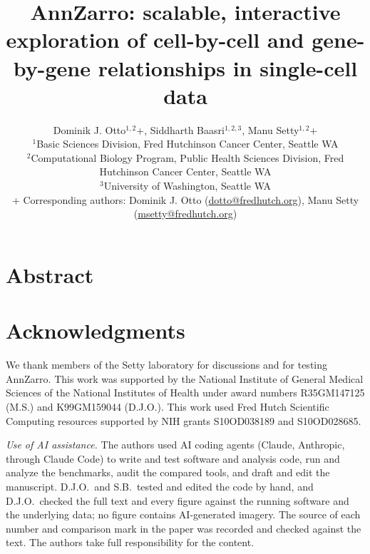 \documentclass[11pt]{article}
\title{AnnZarro: scalable, interactive exploration of cell-by-cell and gene-by-gene relationships in single-cell data}
\author{\hspace*{-\tabcolsep}\parbox{\textwidth}{\raggedright\normalsize
Dominik J. Otto$^{1,2}$+, Siddharth Baasri$^{1,2,3}$, Manu Setty$^{1,2}$+\\[8pt]
$^{1}$Basic Sciences Division, Fred Hutchinson Cancer Center, Seattle WA\\
$^{2}$Computational Biology Program, Public Health Sciences Division, Fred Hutchinson Cancer Center, Seattle WA\\
$^{3}$University of Washington, Seattle WA\\[12pt]
+ Corresponding authors: Dominik J. Otto (\href{mailto:dotto@fredhutch.org}{dotto@fredhutch.org}), Manu Setty (\href{mailto:msetty@fredhutch.org}{msetty@fredhutch.org})}\hspace*{-\tabcolsep}}
\date{}
\begin{document}
\maketitle

\section*{Abstract}






\section*{Acknowledgments}
We thank members of the Setty laboratory for discussions and for testing AnnZarro. This work was supported by the National Institute of General Medical Sciences of the National Institutes of Health under award numbers R35GM147125 (M.S.) and K99GM159044 (D.J.O.). This work used Fred Hutch Scientific Computing resources supported by NIH grants S10OD038189 and S10OD028685. 

\textit{Use of AI assistance.} The authors used AI coding agents (Claude, Anthropic, through Claude Code) to write and test software and analysis code, run and analyze the benchmarks, audit the compared tools, and draft and edit the manuscript. D.J.O.\ and S.B.\ tested and edited the code by hand, and D.J.O.\ checked the full text and every figure against the running software and the underlying data; no figure contains AI-generated imagery. The source of each number and comparison mark in the paper was recorded and checked against the text. The authors take full responsibility for the content.
\end{document}
